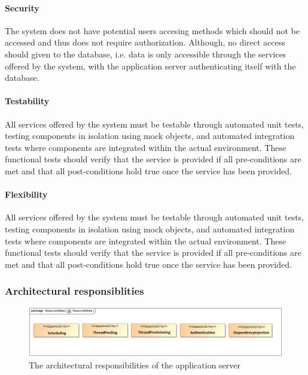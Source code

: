 \documentclass[a4paper,12pt]{report}
\begin{document}
\paragraph {Security}
\hfill \break
The system does not have potential users accesing methods which should not be accessed and thus does not require authorization. Although, no direct access should given to the database, i.e. data is only accessible through the services offered by the system, with the application server authenticating itself with the database.

\paragraph {Testability}
\hfill \break
All services offered by the system must be testable through automated unit tests, testing components in isolation using mock objects, and automated integration tests where components are integrated within the actual environment.
These functional tests should verify that the service is provided if all pre-conditions are met and that all post-conditions hold true once the service has been provided.

\paragraph {Flexibility}
\hfill \break
All services offered by the system must be testable through automated unit tests, testing components in isolation using mock objects, and automated integration tests where components are integrated within the actual environment.
These functional tests should verify that the service is provided if all pre-conditions are met and that all post-conditions hold true once the service has been provided.

\subsubsection {Architectural responsiblities}

	\begin{figure}[htb]
		\centering
		\includegraphics  [scale=0.5]{../Diagrams/applicationServerResponsibiltiesZ.png}
		\caption{The architectural responsibilities of the application server}
	\end{figure}
\end{document}

